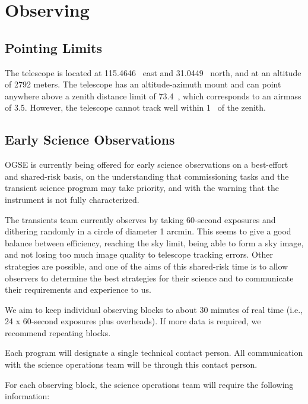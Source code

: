 \chapter{Observing}

\section{Pointing Limits}

The telescope is located at 115.4646~{\deg} east and 31.0449~{\deg} north, and at an 
altitude of 2792 meters. The telescope has an altitude-azimuth mount and can point anywhere above a zenith distance limit of 73.4~{\deg}, which corresponds to an airmass of 3.5. However, the telescope cannot track well within 1~{\deg} of the zenith.

\section{Early Science Observations}

OGSE is currently being offered for early science observations on a best-effort and shared-risk basis, on the understanding that commissioning tasks and the transient science program may take priority, and with the warning that the instrument is not fully characterized. 

The transients team currently observes by taking 60-second exposures and dithering randomly in a circle of diameter 1 arcmin. This seems to give a good balance between efficiency, reaching the sky limit, being able to form a sky image, and not losing too much image quality to telescope tracking errors. Other strategies are possible, and one of the aims of this shared-risk time is to allow observers to determine the best strategies for their science and to communicate their requirements and experience to us.

We aim to keep individual observing blocks to about 30 minutes of real time (i.e., 24 x 60-second exposures plus overheads). If more data is required, we recommend repeating blocks.

Each program will designate a single technical contact person. All communication with the science operations team will be through this contact person.

For each observing block, the science operations team will require the following information:

